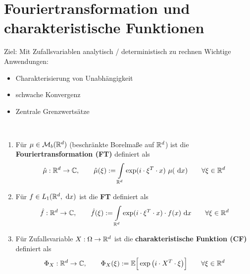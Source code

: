 
\chapter{Fouriertransformation und charakteristische Funktionen} %
Ziel: Mit Zufallsvariablen analytisch / deterministisch zu rechnen \nl
Wichtige Anwendungen:
\begin{itemize}
	\item Charakterisierung von Unabhängigkeit
	\item schwache Konvergenz
	\item Zentrale Grenzwertsätze
\end{itemize}

\begin{defi}\
	\begin{enumerate}[label=(\alph*)]
		\item Für $\mu\in\mathcal{M}_b(\mathbb{R}^d)$ (beschränkte Borelmaße auf $\mathbb{R}^d$) ist die \textbf{Fouriertransformation (FT)} definiert als
		\begin{align*}
			\hat{\mu}:\mathbb{R}^d\to\mathbb{C},\qquad
			\hat{\mu}(\xi):=\int\limits_{\mathbb{R}^d}\exp(i\cdot\xi^T\cdot x)~\mu(\text{ d} x)\qquad\forall\xi\in\mathbb{R}^d
		\end{align*}
		\item Für $f\in L_1(\mathbb{R}^d,\text{ d} x)$ ist die \textbf{FT} definiert als
		\begin{align*}
			\hat{f}:\mathbb{R}^d\to\mathbb{C},\qquad
			\hat{f}(\xi):=\int\limits_{\mathbb{R}^d}\exp(i\cdot\xi^T\cdot x)\cdot f(x)\text{ d} x\qquad\forall\xi\in\mathbb{R}^d
		\end{align*}
		\item Für Zufallsvariable $X:\Omega\to\mathbb{R}^d$ ist die \textbf{charakteristische Funktion (CF)} definiert als
		\begin{align*}
			\Phi_X:\mathbb{R}^d\to\mathbb{C},\qquad
			\Phi_X(\xi):=\mathbb{E}\Big[\exp\big(i\cdot X^T\cdot\xi\big)\Big]\qquad\forall\xi\in\mathbb{R}^d
		\end{align*} 
	\end{enumerate}
\end{defi}


